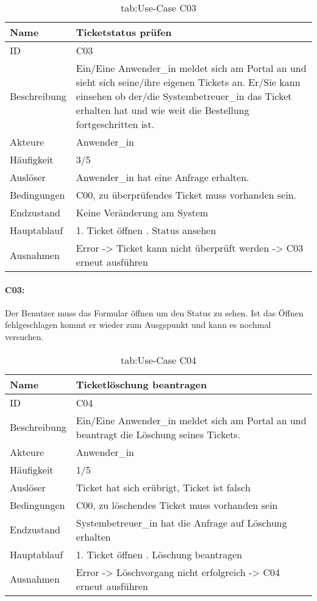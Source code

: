 \newpage
\begin{table}[h]
	\begin{tabular}{|p{3cm}|p{10.7cm}|}
		\hline
		Name & Ticketstatus prüfen\\
		\hline
		ID & C03\\
		\hline
		Beschreibung & Ein/Eine Anwender\_in meldet sich am Portal an und sieht sich seine/ihre eigenen Tickets an. Er/Sie kann einsehen ob der/die Systembetreuer\_in das Ticket erhalten hat und wie weit die Bestellung fortgeschritten ist.\\
		Akteure & Anwender\_in\\
		\hline
		Häufigkeit & 3/5\\
		\hline
		Auslöser & Anwender\_in hat eine Anfrage erhalten.\\
		\hline
		Bedingungen & C00, zu überprüfendes Ticket muss vorhanden sein.\\
		\hline
		Endzustand & Keine Veränderung am System\\
		\hline
		Hauptablauf & 1. Ticket öffnen \newline2. Status ansehen\\
		\hline
		Ausnahmen & Error -> Ticket kann nicht überprüft werden -> C03 erneut ausführen\\
		\hline
	\end{tabular}
	\caption{tab:Use-Case C03}
\end{table}
\label{tab:tab:Use-Case C03}

\paragraph{C03:}
Der Benutzer muss das Formular öffnen um den Status zu sehen. Ist das Öffnen fehlgeschlagen kommt er wieder zum Ausgspunkt und kann es nochmal versuchen.

\newpage
\begin{table}[h]
	\begin{tabular}{|p{3cm}|p{10.7cm}|}
		\hline
		Name & Ticketlöschung beantragen\\
		\hline
		ID & C04\\
		\hline
		Beschreibung & Ein/Eine Anwender\_in meldet sich am Portal an und beantragt die Löschung seines Tickets.\\
		\hline
		Akteure & Anwender\_in\\
		\hline
		Häufigkeit & 1/5\\
		\hline
		Auslöser & Ticket hat sich erübrigt, Ticket ist falsch\\
		\hline
		Bedingungen & C00, zu löschendes Ticket muss vorhanden sein\\
		\hline
		Endzustand & Systembetreuer\_in hat die Anfrage auf Löschung erhalten\\
		\hline
		Hauptablauf & 1. Ticket öffnen \newline2. Löschung beantragen\\
		\hline
		Ausnahmen & Error -> Löschvorgang nicht erfolgreich -> C04 erneut ausführen\\
		\hline
	\end{tabular}
	\caption{tab:Use-Case C04}
\end{table}
\label{tab:tab:Use-Case C04}


